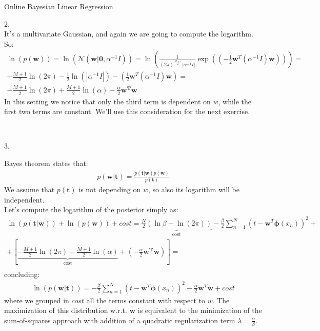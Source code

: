 \documentclass[english]{exercisesheet}
\begin{document}
\begin{nexercise}{Online Bayesian Linear Regression}
  \par 
  \begin{solution} 2.
  \\ It's a multivariate Gaussian, and again we are going to compute the logarithm. So:
  \begin{align*}
  \ln(p(\bm{w})) = \ln(\mathcal{N}(\bm {w} | \bm {0}, \alpha^{-1}I)) =  \ln\left(\frac{1}{(2\pi)^{\frac{M+1}{2}}|\alpha^{-1}I|}\exp\left((-\frac{1}{2}\bm{w}^{T}(\alpha^{-1}I)\bm{w})\right) \right)= \\ -\frac{M+1}{2}\ln(2\pi)-\frac{1}{2}\ln(|\alpha^{-1}I|)-\left(\frac{1}{2}\bm{w}^{T}(\alpha^{-1}I)\bm{w}\right) = \\ -\frac{M+1}{2}\ln(2\pi)+\frac{M+1}{2}\ln(\alpha)-\frac{\alpha}{2}\bm{w^{T}w}
  \end{align*}
  In this setting we notice that only the third term is dependent on $w$, while the first two terms are constant. We'll use this consideration for the next exercise.
    \end{solution}\\
    \begin{solution} 3.
  \par 
  Bayes theorem states that:
  \begin{align*}
  p(\bm{w}|\bm{t}) = \frac{p(\bm{t}|\bm{w})p(\bm{w})}{p(\bm{t})}
  \end{align*}
  We assume that $p(\bm t)$ is not depending on $w$, so also its logarithm will be independent. \\ Let's compute the logarithm of the posterior simply as:
  \begin{align*}
      \ln(p(\bm{t}|\bm{w}))+ \ln(p(\bm{w})) + cost = \underbrace{\frac{N}{2}\left(\ln\beta-\ln(2\pi)\right)}_\text{cost} - \frac{\beta}{2}\sum_{n=1}^{N}(t-\bm{w}^{T}\bm{\phi}(x_{n}))^{2} + \\ + \left[\underbrace{-\frac{M+1}{2}\ln(2\pi)-\frac{M+1}{2}\ln(\alpha)}_\text{cost}+\left(-\frac{\alpha}{2}\bm{w^{T}w}\right)\right] = \\
      \end{align*}
      concluding:
     \begin{align*}
      \ln(p(\bm{w}|\bm{t})) = -\frac{\beta}{2}\sum_{n=1}^{N}(t-\bm{w}^{T}\bm{\phi}(x_{n}))^{2}-\frac{\alpha}{2}\bm{w}^{T}\bm{w} + cost
    \end{align*}
    where we grouped in $cost$ all the terms constant with respect to $w$.
    The maximization of this distribution w.r.t. $\bm{w}$ is equivalent to the minimization of the sum-of-squares approach with addition of a quadratic regularization term $\lambda = \frac{\alpha}{\beta}$. \\

\end{solution}
\end{nexercise}
\end{document}
